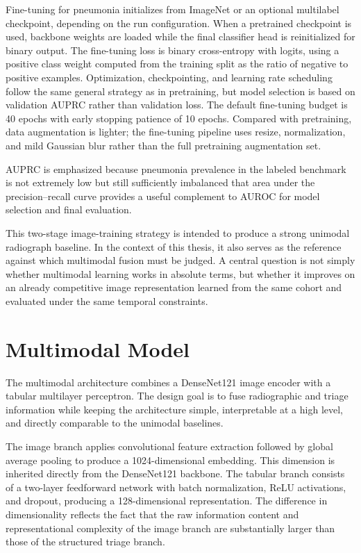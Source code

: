 Fine-tuning for pneumonia initializes from ImageNet or an optional multilabel checkpoint, depending on the run configuration. When a pretrained checkpoint is used, backbone weights are loaded while the final classifier head is reinitialized for binary output. The fine-tuning loss is binary cross-entropy with logits, using a positive class weight computed from the training split as the ratio of negative to positive examples. Optimization, checkpointing, and learning rate scheduling follow the same general strategy as in pretraining, but model selection is based on validation AUPRC rather than validation loss. The default fine-tuning budget is 40 epochs with early stopping patience of 10 epochs. Compared with pretraining, data augmentation is lighter; the fine-tuning pipeline uses resize, normalization, and mild Gaussian blur rather than the full pretraining augmentation set.

AUPRC is emphasized because pneumonia prevalence in the labeled benchmark is not extremely low but still sufficiently imbalanced that area under the precision--recall curve provides a useful complement to AUROC for model selection and final evaluation.

This two-stage image-training strategy is intended to produce a strong unimodal radiograph baseline. In the context of this thesis, it also serves as the reference against which multimodal fusion must be judged. A central question is not simply whether multimodal learning works in absolute terms, but whether it improves on an already competitive image representation learned from the same cohort and evaluated under the same temporal constraints.

\section{Multimodal Model}

The multimodal architecture combines a DenseNet121 image encoder with a tabular multilayer perceptron. The design goal is to fuse radiographic and triage information while keeping the architecture simple, interpretable at a high level, and directly comparable to the unimodal baselines.

The image branch applies convolutional feature extraction followed by global average pooling to produce a 1024-dimensional embedding. This dimension is inherited directly from the DenseNet121 backbone. The tabular branch consists of a two-layer feedforward network with batch normalization, ReLU activations, and dropout, producing a 128-dimensional representation. The difference in dimensionality reflects the fact that the raw information content and representational complexity of the image branch are substantially larger than those of the structured triage branch.

